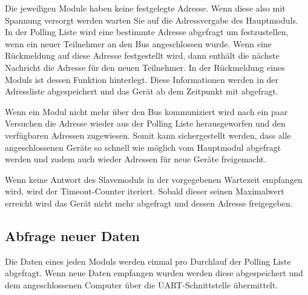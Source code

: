 


\textmd{Die jeweiligen Module haben keine festgelegte Adresse. Wenn diese also mit Spannung versorgt werden warten Sie auf die Adressvergabe des Hauptmoduls.\\
	In der Polling Liste wird eine bestimmte Adresse abgefragt um festzustellen, wenn ein neuer Teilnehmer an den Bus angeschlossen wurde. Wenn eine Rückmeldung auf diese Adresse festgestellt wird, dann enthält die nächste Nachricht die Adresse für den neuen Teilnehmer.
	In der Rückmeldung eines Moduls ist dessen Funktion hinterlegt. Diese Informationen werden in der Adressliste abgespeichert und das Gerät ab dem Zeitpunkt mit abgefragt.\\
}

\newpage


\textmd{Wenn ein Modul nicht mehr über den Bus kommuniziert wird nach ein paar Versuchen die Adresse wieder aus der Polling Liste herausgeworfen und den verfügbaren Adressen zugewiesen. Somit kann sichergestellt werden, dass alle angeschlossenen Geräte so schnell wie möglich vom Hauptmodul abgefragt werden und zudem auch wieder Adressen für neue Geräte freigemacht.
}



\textmd{Wenn keine Antwort des Slavemoduls in der vorgegebenen Wartezeit empfangen wird, wird der Timeout-Counter iteriert. Sobald dieser seinen Maximalwert erreicht wird das Gerät nicht mehr abgefragt und dessen Adresse freigegeben.
}

\newpage
\subsection{Abfrage neuer Daten}
\textmd{Die Daten eines jeden Moduls werden einmal pro Durchlauf der Polling Liste abgefragt. Wenn neue Daten empfangen wurden werden diese abgespeichert und dem angeschlossenen Computer über die UART-Schnittstelle übermittelt.
}



